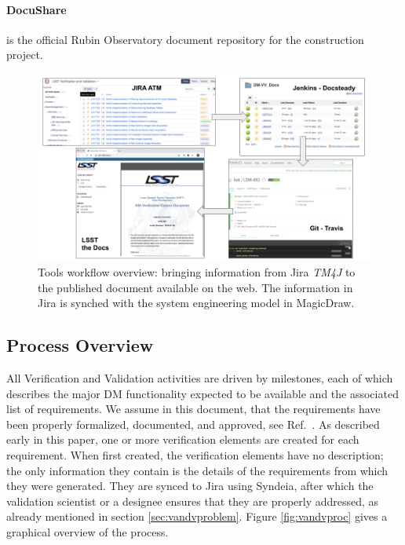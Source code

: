 \paragraph{DocuShare}
is the official Rubin Observatory document repository for the construction project.

\begin{figure}
\begin{center}
\includegraphics[width=\textwidth]{imgs/screenshots.png}
 \caption{Tools workflow overview: bringing information from Jira \textit{TM4J} to the published document available on the web. The information in Jira is synched with the system engineering model in MagicDraw.}
 \label{fig:overview}
\end{center}
\end{figure}


\subsection{Process Overview}\label{sec:proc}

All Verification and Validation activities are driven by milestones, each of which describes the major DM functionality expected to be available and the associated list of requirements. 
We assume in this document, that the requirements have been properly formalized, documented, and approved, 
see Ref.~.
As described early in this paper, one or more verification elements are created for each requirement.
When first created, the verification elements have no description; the only information they contain is the details of the requirements from which they were generated.
They are synced to Jira using Syndeia, after which the validation scientist or a designee ensures that they are properly addressed, as already mentioned in section \ref{sec:vandvproblem}.
Figure  \ref{fig:vandvproc} gives a graphical overview of the process.

